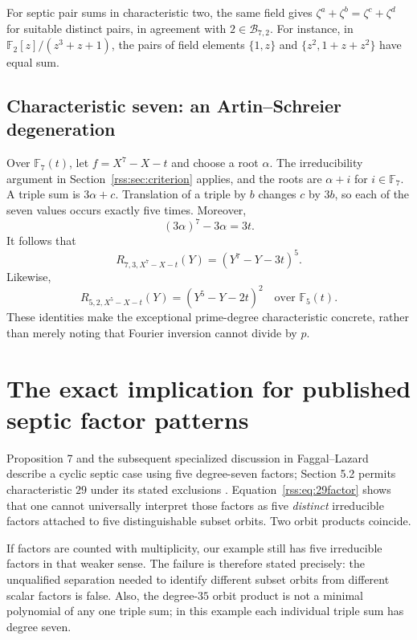 \documentclass[11pt,a4paper]{article}
\theoremstyle{definition}
\theoremstyle{remark}
\newcommand{\F}{\mathbb F}
\begin{document}
For septic pair sums in characteristic two, the same field gives
$\zeta^a+\zeta^b=\zeta^c+\zeta^d$ for suitable distinct pairs, in agreement
with $2\in\mathcal B_{7,2}$. For instance, in
$\F_2[z]/(z^3+z+1)$, the pairs of field elements $\{1,z\}$ and
$\{z^2,1+z+z^2\}$ have equal sum.

\subsection{Characteristic seven: an Artin--Schreier degeneration}

Over $\F_7(t)$, let $f=X^7-X-t$ and choose a root $\alpha$.
The irreducibility argument in Section~\ref{rss:sec:criterion} applies, and the
roots are $\alpha+i$ for $i\in\F_7$. A triple sum is $3\alpha+c$.
Translation of a triple by $b$ changes $c$ by $3b$, so each of the seven
values occurs exactly five times. Moreover,
\[
 (3\alpha)^7-3\alpha=3t.
\]
It follows that
\begin{equation}
 R_{7,3,X^7-X-t}(Y)=(Y^7-Y-3t)^5.
 \label{rss:eq:char7}
\end{equation}
Likewise,
\begin{equation}
 R_{5,2,X^5-X-t}(Y)=(Y^5-Y-2t)^2
 \quad\text{over }\F_5(t).
 \label{rss:eq:char5}
\end{equation}
These identities make the exceptional prime-degree characteristic
concrete, rather than merely noting that Fourier inversion cannot divide
by $p$.

\section{The exact implication for published septic factor patterns}
\label{rss:sec:published}

Proposition 7 and the subsequent specialized discussion in
Faggal--Lazard describe a cyclic septic case using five degree-seven
factors; Section 5.2 permits characteristic $29$ under its stated
exclusions \cite{FaggalLazard2014}. Equation~\eqref{rss:eq:29factor} shows that
one cannot universally interpret those factors as five \emph{distinct}
irreducible factors attached to five distinguishable subset orbits.
Two orbit products coincide.

If factors are counted with multiplicity, our example still has five
irreducible factors in that weaker sense. The failure is therefore stated
precisely: the unqualified separation needed to identify different subset
orbits from different scalar factors is false. Also, the degree-$35$
orbit product is not a minimal polynomial of any one triple sum; in this
example each individual triple sum has degree seven.
\end{document}
